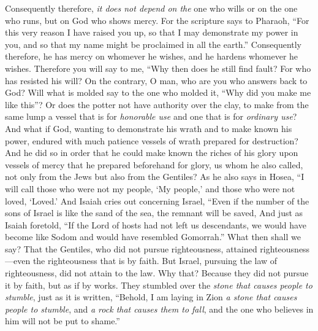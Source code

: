 \begin{biblechapter}
\verse Consequently therefore, \textit{it does not depend on the} one who wills or on the one who runs, but on God who shows mercy.
\verse For the scripture says to Pharaoh, “For this very reason I have raised you up, so that I may demonstrate my power in you, and so that my name might be proclaimed in all the earth.”
\verse Consequently therefore, he has mercy on whomever he wishes, and he hardens whomever he wishes.
\verse Therefore you will say to me, “Why then does he still find fault? For who has resisted his will?
\verse On the contrary, O man, who are you who answers back to God? Will what is molded say to the one who molded it, “Why did you make me like this”?
\verse Or does the potter not have authority over the clay, to make from the same lump a vessel that is for \textit{honorable use} and one that is for \textit{ordinary use}?
\verse And what if God, wanting to demonstrate his wrath and to make known his power, endured with much patience vessels of wrath prepared for destruction?
\verse And he did so in order that he could make known the riches of his glory upon vessels of mercy that he prepared beforehand for glory,
\verse us whom he also called, not only from the Jews but also from the Gentiles?
\verse As he also says in Hosea,
\verse “I will call those who were not my people, ‘My people,’ 
and those who were not loved, ‘Loved.’
\verse And Isaiah cries out concerning Israel,
\verse “Even if the number of the sons of Israel is like the sand of the sea, 
the remnant will be saved,
\verse And just as Isaiah foretold, “If the Lord of hosts had not left us descendants, 
we would have become like Sodom 
and would have resembled Gomorrah.”
\verse What then shall we say? That the Gentiles, who did not pursue righteousness, attained righteousness—even the righteousness that is by faith.
\verse But Israel, pursuing the law of righteousness, did not attain to the law.
\verse Why that? Because they did not pursue it by faith, but as if by works. They stumbled over the \textit{stone that causes people to stumble},
\verse just as it is written, “Behold, I am laying in Zion \textit{a stone that causes people to stumble}, 
and \textit{a rock that causes them to fall}, 
and the one who believes in him will not be put to shame.”
\end{biblechapter}

